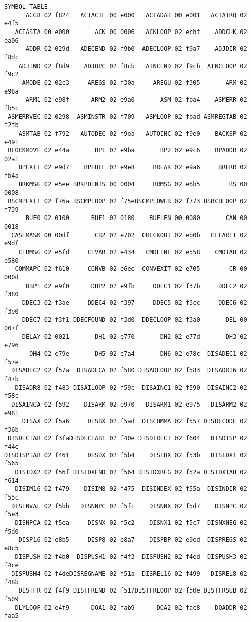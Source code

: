 {\begin{verbatim}
SYMBOL TABLE
      ACC8 02 f824   ACIACTL 00 e000   ACIADAT 00 e001   ACIAIRQ 02 e4f5
   ACIASTA 00 e000       ACK 00 0006   ACKLOOP 02 ecbf    ADDCHK 02 ea06
      ADDR 02 029d   ADECEND 02 f9b0  ADECLOOP 02 f9a7    ADJDIR 02 f8dc
    ADJIND 02 f8d9    ADJOPC 02 f8cb   AINCEND 02 f9cb  AINCLOOP 02 f9c2
     AMODE 02 02c3     AREGS 02 f30a     AREGU 02 f305       ARM 02 e98a
      ARM1 02 e98f      ARM2 02 e9a0       ASM 02 fba4    ASMERR 02 fb5c
 ASMERRVEC 02 0298  ASMINSTR 02 f709   ASMLOOP 02 fbad ASMREGTAB 02 f2fb
    ASMTAB 02 f792   AUTODEC 02 f9ea   AUTOINC 02 f9e0    BACKSP 02 e491
 BLOCKMOVE 02 e44a       BP1 02 e9ba       BP2 02 e9c6    BPADDR 02 02a1
    BPEXIT 02 e9d7    BPFULL 02 e9e8     BREAK 02 e9a6     BRERR 02 fb4a
    BRKMSG 02 e5ee BRKPOINTS 00 0004     BRMSG 02 e6b5        BS 00 0008
 BSCMPEXIT 02 f76a BSCMPLOOP 02 f75eBSCMPLOWER 02 f773 BSRCHLOOP 02 f739
      BUF0 02 0100      BUF1 02 0180    BUFLEN 00 0080       CAN 00 0018
  CASEMASK 00 00df       CB2 02 e702  CHECKOUT 02 eb0b   CLEARIT 02 e9df
    CLRMSG 02 e5fd     CLVAR 02 e434   CMDLINE 02 e558    CMDTAB 02 e580
   COMMAPC 02 f610     CONVB 02 e6ee  CONVEXIT 02 e705        CR 00 000d
      DBP1 02 e9f0      DBP2 02 e9fb     DDEC1 02 f37b     DDEC2 02 f380
     DDEC3 02 f3ae     DDEC4 02 f397     DDEC5 02 f3cc     DDEC6 02 f3e0
     DDEC7 02 f3f1 DDECFOUND 02 f3d0  DDECLOOP 02 f3a0       DEL 00 007f
     DELAY 02 0021       DH1 02 e770       DH2 02 e77d       DH3 02 e796
       DH4 02 e79e       DH5 02 e7a4       DH6 02 e78c  DISADEC1 02 f57e
  DISADEC2 02 f57a  DISADECA 02 f580 DISADLOOP 02 f583  DISADR16 02 f47b
   DISADR8 02 f483 DISAILOOP 02 f59c  DISAINC1 02 f590  DISAINC2 02 f58c
  DISAINCA 02 f592    DISARM 02 e970   DISARM1 02 e975   DISARM2 02 e981
     DISAX 02 f5a6     DISBX 02 f5ad  DISCOMMA 02 f557 DISDECODE 02 f36b
 DISDECTAB 02 f3faDISDECTAB1 02 f40e DISDIRECT 02 f604   DISDISP 02 f44e
DISDISPTAB 02 f461     DISDX 02 f5b4    DISIDX 02 f53b   DISIDX1 02 f565
   DISIDX2 02 f56f DISIDXEND 02 f564 DISIDXREG 02 f52a DISIDXTAB 02 f614
   DISIM16 02 f479    DISIM8 02 f475  DISINDEX 02 f55a  DISINDIR 02 f55c
  DISINVAL 02 f5bb   DISNNPC 02 f5fc    DISNNX 02 f5d7    DISNPC 02 f5e3
   DISNPCA 02 f5ea     DISNX 02 f5c2    DISNX1 02 f5c7  DISNXNEG 02 f5d0
    DISP16 02 e8b5     DISP8 02 e8a7    DISPBP 02 e9ed  DISPREGS 02 e8c5
   DISPUSH 02 f4b0  DISPUSH1 02 f4f3  DISPUSH2 02 f4ed  DISPUSH3 02 f4ce
  DISPUSH4 02 f4deDISREGNAME 02 f51a  DISREL16 02 f499   DISREL8 02 f48b
    DISTFR 02 f4f9 DISTFREND 02 f517DISTFRLOOP 02 f50e DISTFRSUB 02 f509
   DLYLOOP 02 e4f9      DOA1 02 fab9      DOA2 02 fac8    DOADDR 02 faa5

\end{verbatim}}
